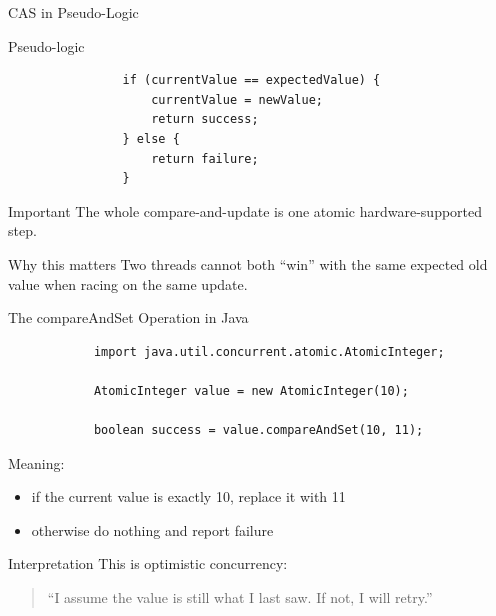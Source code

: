 \documentclass[aspectratio=169,11pt]{beamer}
\begin{document}
	\begin{frame}[fragile]{CAS in Pseudo-Logic}
		\begin{block}{Pseudo-logic}
			\begin{verbatim}
				if (currentValue == expectedValue) {
					currentValue = newValue;
					return success;
				} else {
					return failure;
				}
			\end{verbatim}
		\end{block}
		
		\vspace{0.35cm}
		
		\begin{alertblock}{Important}
			The whole compare-and-update is one atomic hardware-supported step.
		\end{alertblock}
		
		\vspace{0.25cm}
		
		\begin{exampleblock}{Why this matters}
			Two threads cannot both ``win'' with the same expected old value when racing on the same update.
		\end{exampleblock}
	\end{frame}
	
	\begin{frame}[fragile]{The compareAndSet Operation in Java}
		\begin{lstlisting}
			import java.util.concurrent.atomic.AtomicInteger;
			
			AtomicInteger value = new AtomicInteger(10);
			
			boolean success = value.compareAndSet(10, 11);
		\end{lstlisting}
		
		\vspace{0.25cm}
		
		Meaning:
		\begin{itemize}
			\item if the current value is exactly 10, replace it with 11
			\item otherwise do nothing and report failure
		\end{itemize}
		
		\vspace{0.35cm}
		
		\begin{block}{Interpretation}
			This is optimistic concurrency:
			\begin{quote}
				``I assume the value is still what I last saw.  
				If not, I will retry.''
			\end{quote}
		\end{block}
	\end{frame}
	
\end{document}
